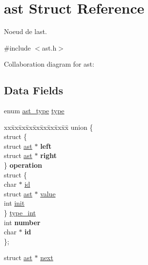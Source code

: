 \hypertarget{structast}{}\section{ast Struct Reference}
\label{structast}


Noeud de l\textquotesingle{}ast.  




{\ttfamily \#include $<$ast.\+h$>$}



Collaboration diagram for ast\+:
\subsection*{Data Fields}
\begin{DoxyCompactItemize}
\item 
enum \hyperlink{ast_8h_a77091c187ac9a89404fac2e8226daef3}{ast\+\_\+type} \hyperlink{structast_ac332bc7c73f2f41826e84e908db475dc}{type}
\item 
\mbox{\label{structast_aa607c7a27d555cb2310d47623165269a}} 
\begin{tabbing}
xx\=xx\=xx\=xx\=xx\=xx\=xx\=xx\=xx\=\kill
union \{\\
\>struct \{\\
\>\>struct \hyperlink{structast}{ast} $\ast$ {\bfseries left}\\
\>\>struct \hyperlink{structast}{ast} $\ast$ {\bfseries right}\\
\>\} {\bfseries operation}\\
\>struct \{\\
\>\>char $\ast$ \hyperlink{structast_aecb3b0d045ada529257a2fbf8f829599}{id}\\
\>\>struct \hyperlink{structast}{ast} $\ast$ \hyperlink{structast_a0547e48c9f9ecb35c94f988890f217b7}{value}\\
\>\>int \hyperlink{structast_a795ea50921b36311ffd5e7baa2ef1f7e}{init}\\
\>\} \hyperlink{structast_a48c1fea64ccd73c68d3901c23d65f9f5}{type\_int}\\
\>int {\bfseries number}\\
\>char $\ast$ {\bfseries id}\\
\}; \\

\end{tabbing}\item 
struct \hyperlink{structast}{ast} $\ast$ \hyperlink{structast_ae48f04f7acec87ecf7f0bc953cb56bf4}{next}
\end{DoxyCompactItemize}


